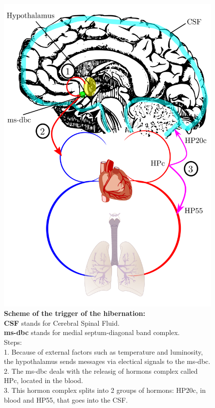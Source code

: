 \documentclass[draft, final]{report}
\begin{document}
\begin{figure}[!ht]
  \centering
  \includegraphics[scale=0.42]{LateX/Images/hibernationscheme.png}
  \caption{\textbf{Scheme of the trigger of the hibernation:}
        \\ \textbf{CSF} stands for Cerebral Spinal Fluid.
        \\ \textbf{ms-dbc} stands for medial septum-diagonal band complex.
        \\ Steps:
        \\ 1. Because of external factors such as temperature and luminosity, the hypothalamus sends messages via electical signals to the ms-dbc.
        \\ 2. The ms-dbc deals with the releasig of hormons complex called HPc, located in the blood.
        \\ 3. This hormon complex splits into 2 groups of hormons: HP20c, in blood and HP55, that goes into the CSF.
        }
\end{figure}
\end{document}
